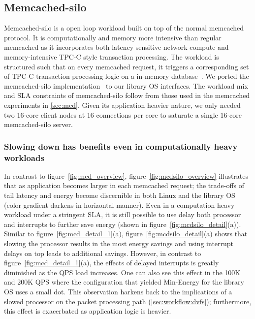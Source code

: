 \subsection{Memcached-silo}
\label{sec:mcdsilo}
Memcached-silo is a open loop workload built on top of the normal memcached protocol. It is computationally and memory more intensive than regular memcached as it incorporates both latency-sensitive network compute and memory-intensive TPC-C style transaction processing. The workload is structured such that on every memcached request, it triggers a corresponding set of TPC-C transaction processing logic on a in-memory database~\cite{silo}. We ported the memcached-silo implementation~\cite{mcdsilo, zygos} to our library OS interfaces. The workload mix and SLA constraints of memcached-silo follow from those used in the memcached experiments in \cref{sec:mcd}. Given its application heavier nature, we only needed two 16-core client nodes at 16 connections per core to saturate a single 16-core memcached-silo server. 

\subsubsection{Slowing down has benefits even in computationally heavy workloads}
\label{sec:mcdsilo:dvfstradeoff}
In contrast to figure~\ref{fig:mcd_overview}, figure~\ref{fig:mcdsilo_overview} illustrates that as application becomes larger in each memcached request; the trade-offs of tail latency and energy become discernible in both Linux and the library OS (color gradient darkens in horizontal manner). Even in a computation heavy workload under a stringent SLA, it is still possible to use delay both processor and interrupts to further save energy (shown in figure~\ref{fig:mcdsilo_detail}(a)). Similar to figure~\ref{fig:mcd_detail_1}(a), figure~\ref{fig:mcdsilo_detail}(a) shows that slowing the processor results in the most energy savings and using interrupt delays on top leads to additional savings. However, in contrast to figure~\ref{fig:mcd_detail_1}(a), the effects of delayed interrupts is greatly diminished as the QPS load increases. One can also see this effect in the 100K and 200K QPS where the configuration that yielded Min-Energy for the library OS uses a small dot. This observation harkens back to the implications of a slowed processor on the packet processing path (\cref{sec:workflow:dvfs}); furthermore, this effect is exacerbated as application logic is heavier.

